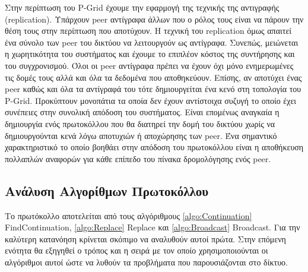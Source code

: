 Στην περίπτωση του P-Grid έχουμε την εφαρμογή της τεχνικής της 
αντιγραφής (replication). Υπάρχουν peer αντίγραφα άλλων που ο ρόλος τους 
είναι να πάρουν την θέση τους στην περίπτωση που αποτύχουν. 
Η τεχνική του replication όμως απαιτεί ένα σύνολο των peer του δικτύου να 
λειτουργούν ως αντίγραφα. Συνεπώς, μειώνεται η χωρητικότητα του συστήματος 
και έχουμε το επιπλέον κόστος της συντήρησης και του συγχρονισμού. Όλοι οι peer 
αντίγραφα πρέπει να έχουν όχι μόνο ενημερωμένες τις δομές τους αλλά και 
όλα τα δεδομένα που αποθηκεύουν. Επίσης, αν αποτύχει ένας peer καθώς και όλα 
τα αντίγραφά του τότε δημιουργείται ένα κενό στη τοπολογία του P-Grid. 
Προκύπτουν μονοπάτια τα οποία δεν έχουν αντίστοιχα συζυγή το οποίο έχει 
συνέπειες στην συνολική απόδοση του συστήματος. Είναι επομένως αναγκαία η 
δημιουργία ενός πρωτοκόλλου που θα διατηρεί την δομή του δικτύου χωρίς να 
δημιουργούνται κενά λόγω αποτυχιών ή αποχώρησης των peer. Ένα σημαντικό 
χαρακτηριστικό το οποίο βοηθάει στην απόδοση του πρωτοκόλλου είναι η 
αποθήκευση πολλαπλών αναφορών για κάθε επίπεδο του πίνακα δρομολόγησης 
ενός peer.

\subsection{Ανάλυση Αλγορίθμων Πρωτοκόλλου}

Το πρωτόκολλο αποτελείται από τους αλγόριθμους \ref{algo:Continuation} 
FindContinuation, \ref{algo:Replace} Replace και \ref{algo:Broadcast} 
Broadcast. Για την καλύτερη κατανόηση κρίνεται σκόπιμο να αναλυθούν 
αυτοί πρώτα. Στην επόμενη ενότητα θα εξηγηθεί ο τρόπος και η σειρά με τον 
οποίο χρησιμοποιούνται οι αλγόριθμοι αυτοί ώστε να λυθούν τα προβλήματα που 
παρουσιάζονται στο δίκτυο.

